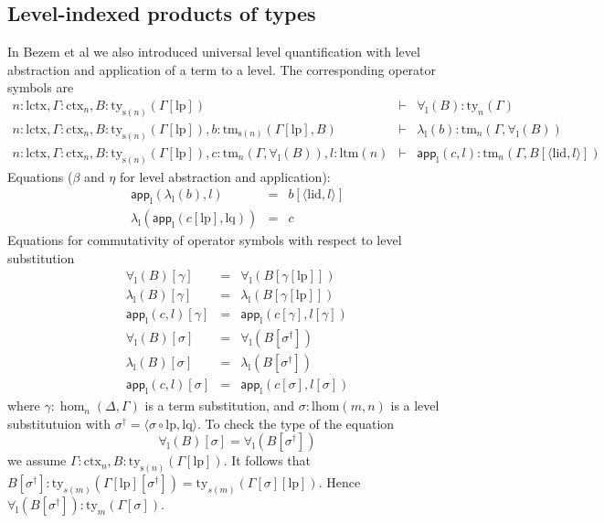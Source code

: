 \documentclass[11pt,a4paper]{article}
\theoremstyle{definition}
\newcommand{\app}[2]{{#1\,#2}} %
\def\lhom{\mathrm{lhom}}
\def\lctx{\mathrm{lctx}}
\def\ltm{\mathrm{ltm}}
\def\lp{\mathrm{lp}}
\def\lq{\mathrm{lq}}
\def\s{\mathrm{s}}
\def\lid{\mathrm{lid}}
\newcommand{\ctx}{\mathrm{ctx}}
\newcommand{\ty}{\mathrm{ty}}
\newcommand{\tm}{\mathrm{tm}}
\newcommand{\tuple}[1]{\langle #1 \rangle}
\def\app{\mathsf{app}}
\begin{document}

\subsection{Level-indexed products of types}
\def\l{\mathrm{l}}
In Bezem et al \cite{BezemCDE22} we also introduced 
universal level quantification with level abstraction and application of a term to a level. The corresponding operator symbols are
\begin{eqnarray*}
n : \lctx, \Gamma : \ctx_n, B : \ty_{\s(n)}(\Gamma[\lp])&\vdash& \forall_\l(B) : \ty_n(\Gamma)\\
n : \lctx, \Gamma : \ctx_n, B : \ty_{\s(n)}(\Gamma[\lp]), b : \tm_{\s(n)}(\Gamma[\lp], B) &\vdash& \lambda_\l(b) : \tm_n(\Gamma,\forall_\l(B))\\
n : \lctx, \Gamma : \ctx_n, B : \ty_{\s(n)}(\Gamma[\lp]), c :  \tm_n(\Gamma,\forall_\l(B)), l : \ltm(n) &\vdash& \app_\l(c,l) : \tm_n(\Gamma, B[\tuple{\lid,l}])
\end{eqnarray*}
Equations ($\beta$ and $\eta$ for level abstraction and application):
 \begin{eqnarray*}
 \app_\l(\lambda_\l(b),l) &=& b[\tuple{\lid,l}]\\
 \lambda_\l(\app_\l(c[\lp],\lq)) &=& c
 \end{eqnarray*}
 Equations for commutativity of operator symbols with respect to level substitution
 \begin{eqnarray*}
 \forall_\l(B)[ \gamma ] &=& \forall_\l(B[ \gamma[\lp]])\\
 \lambda_\l(B)[ \gamma ] &=& \lambda_\l(B[ \gamma[\lp]])\\
 \app_\l(c,l)[ \gamma ] &=& \app_\l(c[ \gamma ] ,l[ \gamma ] )\\
 \forall_\l(B)[ \sigma ] &=& \forall_\l(B[ \sigma^{\dagger}])\\
 \lambda_\l(B)[ \sigma ] &=& \lambda_\l(B[ \sigma^{\dagger}])\\
\app_\l(c,l)[ \sigma ] &=& \app_\l(c[ \sigma ] ,l[ \sigma ] )
\end{eqnarray*}
where $\gamma : \hom_n(\Delta,\Gamma)$ is a term substitution, and $\sigma : \lhom(m,n)$ is a level substitutuion with $\sigma^\dagger = \tuple{\sigma \circ \lp, \lq}$. 
To check the type of the equation
$$ \forall_\l(B)[ \sigma ] = \forall_\l(B[ \sigma^{\dagger}])$$ we assume $\Gamma : \ctx_n, B : \ty_{\s(n)}(\Gamma[\lp])$. It follows that $B[\sigma^\dagger] : \ty_{s(m)}(\Gamma[\lp][\sigma^\dagger]) = \ty_{s(m)}(\Gamma[\sigma][\lp])$. Hence 
$\forall_\l(B[ \sigma^{\dagger}]) : \ty_m(\Gamma[\sigma])$.
\end{document}
